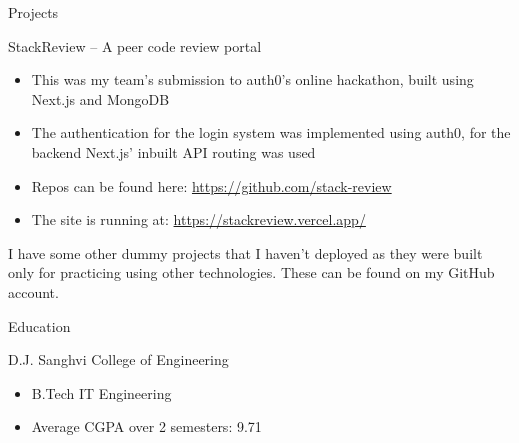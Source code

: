 \documentclass{article}
\newlength{\tabin}
\newlength{\secsep}
\newcommand{\lineunder}{\vspace*{-8pt} \\ \hspace*{-6pt} \hrulefill \\ \vspace*{-15pt}}
\newenvironment{tabbedsection}[1]{
  \begin{list}{}{
      \setlength{\itemsep}{0pt}
      \setlength{\labelsep}{0pt}
      \setlength{\labelwidth}{0pt}
      \setlength{\leftmargin}{\tabin}
      \setlength{\rightmargin}{\tabin}
      \setlength{\listparindent}{0pt}
      \setlength{\parsep}{0pt}
      \setlength{\parskip}{0pt}
      \setlength{\partopsep}{0pt}
      \setlength{\topsep}{#1}
    }
  \item[]
}{\end{list}}
\newenvironment{resume_section}[1]{
  \filbreak
  \vspace{2\secsep}
  \textsc{\large#1}
  \lineunder
  \begin{tabbedsection}{\secsep}
}{\end{tabbedsection}}
\newenvironment{resume_subsection}[2][]{
  \textbf{#2} \hfill {\footnotesize #1} \hspace{2em}
  \begin{tabbedsection}{0.5\secsep}
}{\end{tabbedsection}}
\newenvironment{subitems}{
  \renewcommand{\labelitemi}{-}
  \begin{itemize}
      \setlength{\labelsep}{1em}
}{\end{itemize}}
\begin{document}
\begin{resume_section}{Projects}
    \begin{resume_subsection}{StackReview -- A peer code review portal}
        \begin{subitems}
            \item This was my team's submission to auth0's online hackathon, built using Next.js and MongoDB
            \item The authentication for the login system was implemented using auth0, for the backend Next.js' inbuilt API routing was used
            \item Repos can be found here: \href{https://github.com/stack-review}{https://github.com/stack-review}
            \item The site is running at: \href{https://stackreview.vercel.app/}{https://stackreview.vercel.app/}
        \end{subitems}
    \end{resume_subsection}
    I have some other dummy projects that I haven't deployed as they were built only for practicing using other technologies. These can be found on my GitHub account.
\end{resume_section}


\begin{resume_section}{Education}
    \begin{resume_subsection}[2019 - 2023 (expected)]{D.J. Sanghvi College of Engineering}
    \begin{subitems}
      \item B.Tech IT Engineering
      \item Average CGPA over 2 semesters: 9.71
    \end{subitems}
  \end{resume_subsection}
\end{resume_section}

\vspace{1cm}
\end{document}
